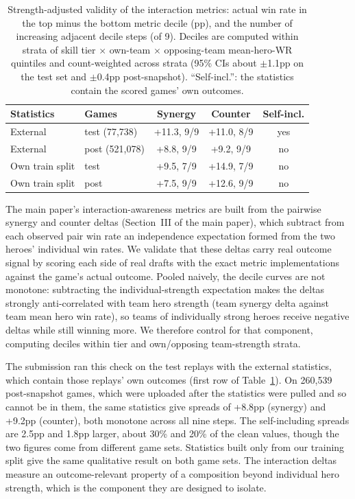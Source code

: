 \documentclass[journal]{IEEEtran}
\begin{document}
\begin{table}[t]
\centering
\caption{Strength-adjusted validity of the interaction metrics: actual win rate in the top minus the bottom metric decile (pp), and the number of increasing adjacent decile steps (of 9). Deciles are computed within strata of skill tier $\times$ own-team $\times$ opposing-team mean-hero-WR quintiles and count-weighted across strata (95\% CIs about $\pm$1.1pp on the test set and $\pm$0.4pp post-snapshot). ``Self-incl.'': the statistics contain the scored games' own outcomes.}
\label{tab:metricvalid}
\setlength{\tabcolsep}{2.5pt}
\small
\begin{tabular}{llccc}
\toprule
Statistics & Games & Synergy & Counter & Self-incl. \\
\midrule
External & test (77,738) & +11.3, 9/9 & +11.0, 8/9 & yes \\
External & post (521,078) & +8.8, 9/9 & +9.2, 9/9 & no \\
Own train split & test & +9.5, 7/9 & +14.9, 7/9 & no \\
Own train split & post & +7.5, 9/9 & +12.6, 9/9 & no \\
\bottomrule
\end{tabular}
\end{table}

The main paper's interaction-awareness metrics are built from the pairwise synergy and counter deltas (Section~III of the main paper), which subtract from each observed pair win rate an independence expectation formed from the two heroes' individual win rates. We validate that these deltas carry real outcome signal by scoring each side of real drafts with the exact metric implementations against the game's actual outcome. Pooled naively, the decile curves are not monotone: subtracting the individual-strength expectation makes the deltas strongly anti-correlated with team hero strength (team synergy delta against team mean hero win rate), so teams of individually strong heroes receive negative deltas while still winning more. We therefore control for that component, computing deciles within tier and own/opposing team-strength strata.

The submission ran this check on the test replays with the external statistics, which contain those replays' own outcomes (first row of Table~\ref{tab:metricvalid}). On 260,539 post-snapshot games, which were uploaded after the statistics were pulled and so cannot be in them, the same statistics give spreads of +8.8pp (synergy) and +9.2pp (counter), both monotone across all nine steps. The self-including spreads are 2.5pp and 1.8pp larger, about 30\% and 20\% of the clean values, though the two figures come from different game sets. Statistics built only from our training split give the same qualitative result on both game sets. The interaction deltas measure an outcome-relevant property of a composition beyond individual hero strength, which is the component they are designed to isolate. 
\end{document}
